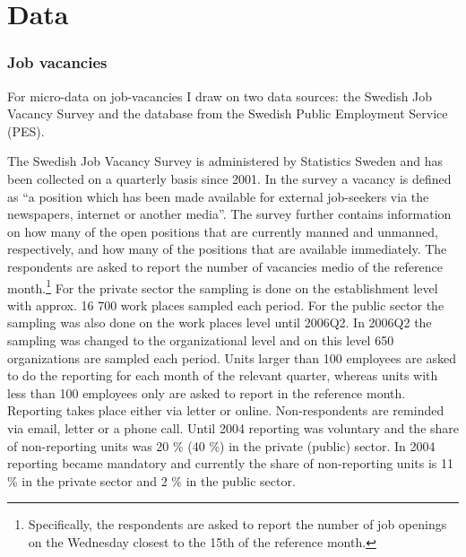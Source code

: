 \section{Data}
\label{sec:data}

\subsubsection{Job vacancies}

For micro-data on job-vacancies I draw on two data sources: the Swedish Job Vacancy Survey and the database from the Swedish Public Employment Service (PES). 

The Swedish Job Vacancy Survey is administered by Statistics Sweden and has been collected on a quarterly basis since 2001. In the survey a vacancy is defined as 
\enquote{a position which has been made available for external job-seekers via the newspapers, internet or another media}. The survey further contains information on how many of the open positions that are currently manned and unmanned, respectively, and how many of the positions that are available immediately. The respondents are asked to report the number of vacancies medio of the reference month.\footnote{Specifically, the respondents are asked to report the number of job openings on the Wednesday closest to the 15th of the reference month.} For the private sector the sampling is done on the establishment level with approx. 16 700 work places sampled each period. For the public sector the sampling was also done on the work places level until 2006Q2. In 2006Q2 the sampling was changed to the organizational level and on this level 650 organizations are sampled each period. Units larger than 100 employees are asked to do the reporting for each month of the relevant quarter, whereas units with less than 100 employees only are asked to report in the reference month. Reporting takes place either via letter or online. Non-respondents are reminded via email, letter or a phone call. Until 2004 reporting was voluntary and the share of non-reporting units was 20 \% (40 \%) in the private (public) sector. In 2004 reporting became mandatory and currently the share of non-reporting units is 11 \% in the private sector and 2 \% in the public sector.


